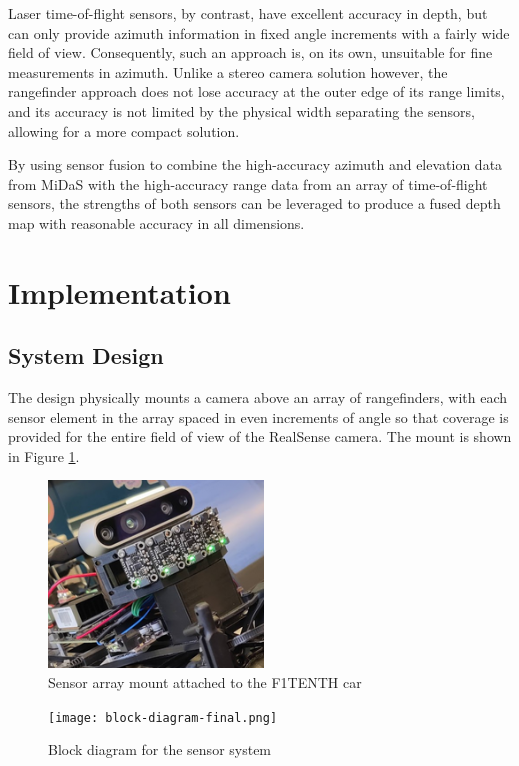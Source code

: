 \documentclass[conference]{IEEEtran}
\begin{document}
Laser time-of-flight sensors, by contrast, have excellent accuracy in depth,
but can only provide azimuth information in fixed angle increments with a
fairly wide field of view. Consequently, such an approach is, on its own,
unsuitable for fine measurements in azimuth. Unlike a stereo camera solution
however, the rangefinder approach does not lose accuracy at the outer edge of
its range limits, and its accuracy is not limited by the physical width
separating the sensors, allowing for a more compact solution.

By using sensor fusion to combine the high-accuracy azimuth and elevation data
from MiDaS with the high-accuracy range data from an array of time-of-flight
sensors, the strengths of both sensors can be leveraged to produce a fused
depth map with reasonable accuracy in all dimensions.


\section{Implementation}

\subsection{System Design}

The design physically mounts a camera above an array of rangefinders, with each
sensor element in the array spaced in even increments of angle so that coverage
is provided for the entire field of view of the RealSense camera. The mount is
shown in Figure \ref{fig:mount}.

\begin{figure}
\centering
\includegraphics[scale=1.10]{mount.png}
\caption{Sensor array mount attached to the F1TENTH car}
\label{fig:mount}
\end{figure}


\begin{figure}
\centering
\texttt{[image: block-diagram-final.png]}
\caption{Block diagram for the sensor system}
\label{fig:block-diagram}
\end{figure}
\end{document}
